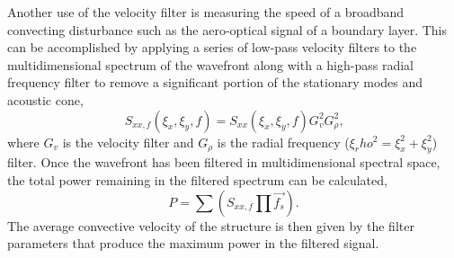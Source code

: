 Another use of the velocity filter is measuring the speed of a broadband convecting disturbance such as the aero-optical signal of a boundary layer.
This can be accomplished by applying a series of low-pass velocity filters to the multidimensional spectrum of the wavefront along with a high-pass radial frequency filter to remove a significant portion of the stationary modes and acoustic cone,
\begin{equation}
  S_{xx,f}(\xi_x,\xi_y,f) = S_{xx}(\xi_x,\xi_y,f) G_v^2 G_\rho^2 \textrm{,}
  \label{eqn:06_velocity_filter_measurement}
\end{equation}
where $G_v$ is the velocity filter and $G_\rho$ is the radial frequency ($\xi_rho^2 = \xi_x^2+\xi_y^2$) filter.
Once the wavefront has been filtered in multidimensional spectral space, the total power remaining in the filtered spectrum can be calculated,
\begin{equation}
  P = \sum (S_{xx,f}\prod{\overrightarrow{f_s}}) \textrm{.}
\end{equation}
The average convective velocity of the structure is then given by the filter parameters that produce the maximum power in the filtered signal.

